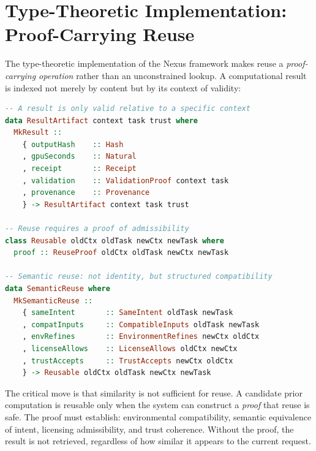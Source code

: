 \section{Type-Theoretic Implementation: Proof-Carrying Reuse}
\label{sec:type-theoretic}

The type-theoretic implementation of the Nexus framework
makes reuse a \emph{proof-carrying operation} rather
than an unconstrained lookup. A computational result
is indexed not merely by content but by its context
of validity:

\begin{lstlisting}[language=Haskell, caption={Core Nexus Types (Haskell-like pseudocode)}]
-- A result is only valid relative to a specific context
data ResultArtifact context task trust where
  MkResult ::
    { outputHash    :: Hash
    , gpuSeconds    :: Natural
    , receipt       :: Receipt
    , validation    :: ValidationProof context task
    , provenance    :: Provenance
    } -> ResultArtifact context task trust

-- Reuse requires a proof of admissibility
class Reusable oldCtx oldTask newCtx newTask where
  proof :: ReuseProof oldCtx oldTask newCtx newTask

-- Semantic reuse: not identity, but structured compatibility
data SemanticReuse where
  MkSemanticReuse ::
    { sameIntent       :: SameIntent oldTask newTask
    , compatInputs     :: CompatibleInputs oldTask newTask
    , envRefines       :: EnvironmentRefines newCtx oldCtx
    , licenseAllows    :: LicenseAllows oldCtx newCtx
    , trustAccepts     :: TrustAccepts newCtx oldCtx
    } -> Reusable oldCtx oldTask newCtx newTask
\end{lstlisting}

The critical move is that similarity is not sufficient
for reuse. A candidate prior computation is reusable
only when the system can construct a \emph{proof} that
reuse is safe. The proof must establish: environmental
compatibility, semantic equivalence of intent, licensing
admissibility, and trust coherence. Without the proof,
the result is not retrieved, regardless of how similar
it appears to the current request.

